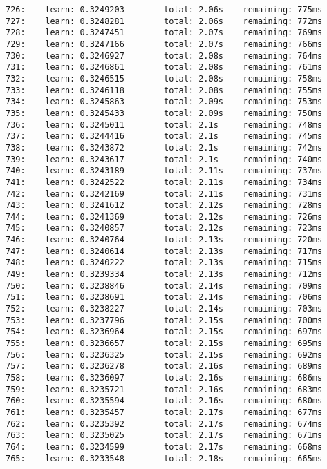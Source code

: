\documentclass[11pt]{article}
\begin{document}
\begin{Verbatim}[commandchars=\\\{\}]
726:    learn: 0.3249203        total: 2.06s    remaining: 775ms
727:    learn: 0.3248281        total: 2.06s    remaining: 772ms
728:    learn: 0.3247451        total: 2.07s    remaining: 769ms
729:    learn: 0.3247166        total: 2.07s    remaining: 766ms
730:    learn: 0.3246927        total: 2.08s    remaining: 764ms
731:    learn: 0.3246861        total: 2.08s    remaining: 761ms
732:    learn: 0.3246515        total: 2.08s    remaining: 758ms
733:    learn: 0.3246118        total: 2.08s    remaining: 755ms
734:    learn: 0.3245863        total: 2.09s    remaining: 753ms
735:    learn: 0.3245433        total: 2.09s    remaining: 750ms
736:    learn: 0.3245011        total: 2.1s     remaining: 748ms
737:    learn: 0.3244416        total: 2.1s     remaining: 745ms
738:    learn: 0.3243872        total: 2.1s     remaining: 742ms
739:    learn: 0.3243617        total: 2.1s     remaining: 740ms
740:    learn: 0.3243189        total: 2.11s    remaining: 737ms
741:    learn: 0.3242522        total: 2.11s    remaining: 734ms
742:    learn: 0.3242169        total: 2.11s    remaining: 731ms
743:    learn: 0.3241612        total: 2.12s    remaining: 728ms
744:    learn: 0.3241369        total: 2.12s    remaining: 726ms
745:    learn: 0.3240857        total: 2.12s    remaining: 723ms
746:    learn: 0.3240764        total: 2.13s    remaining: 720ms
747:    learn: 0.3240614        total: 2.13s    remaining: 717ms
748:    learn: 0.3240222        total: 2.13s    remaining: 715ms
749:    learn: 0.3239334        total: 2.13s    remaining: 712ms
750:    learn: 0.3238846        total: 2.14s    remaining: 709ms
751:    learn: 0.3238691        total: 2.14s    remaining: 706ms
752:    learn: 0.3238227        total: 2.14s    remaining: 703ms
753:    learn: 0.3237796        total: 2.15s    remaining: 700ms
754:    learn: 0.3236964        total: 2.15s    remaining: 697ms
755:    learn: 0.3236657        total: 2.15s    remaining: 695ms
756:    learn: 0.3236325        total: 2.15s    remaining: 692ms
757:    learn: 0.3236278        total: 2.16s    remaining: 689ms
758:    learn: 0.3236097        total: 2.16s    remaining: 686ms
759:    learn: 0.3235721        total: 2.16s    remaining: 683ms
760:    learn: 0.3235594        total: 2.16s    remaining: 680ms
761:    learn: 0.3235457        total: 2.17s    remaining: 677ms
762:    learn: 0.3235392        total: 2.17s    remaining: 674ms
763:    learn: 0.3235025        total: 2.17s    remaining: 671ms
764:    learn: 0.3234599        total: 2.17s    remaining: 668ms
765:    learn: 0.3233548        total: 2.18s    remaining: 665ms

\end{Verbatim}
\end{document}
